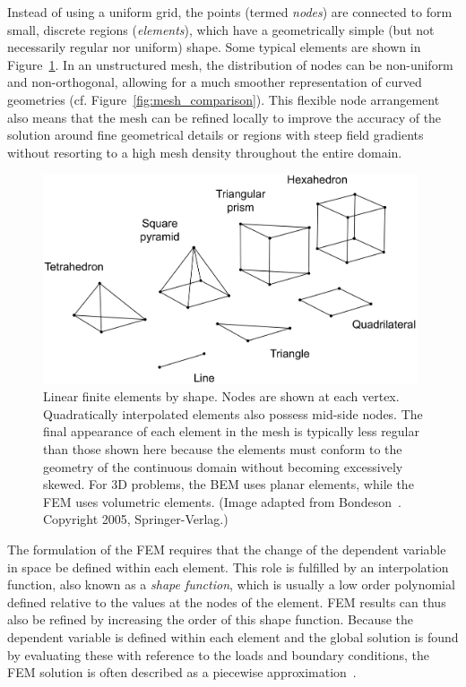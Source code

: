 Instead of using a uniform grid, the points (termed \emph{nodes}) are connected
to form small, discrete regions (\emph{elements}), which have a geometrically
simple (but not necessarily regular nor uniform) shape. Some typical elements
are shown in Figure~\ref{fig:element_types}. In an unstructured mesh, the
distribution of nodes can be non-uniform and non-orthogonal, allowing for a much
smoother representation of curved geometries (cf.
Figure~\ref{fig:mesh_comparison}). This flexible node arrangement also means
that the mesh can be refined locally to improve the accuracy of the solution
around fine geometrical details or regions with steep field gradients without
resorting to a high mesh density throughout the entire domain.

\begin{figure}
	\centering
	\includegraphics[height=6.2cm]{Background/element_types}
	\caption[Linear finite elements by shape]{Linear finite elements by shape.
	Nodes are shown at each vertex. Quadratically interpolated elements also
	possess mid-side nodes. The final appearance of each element in the mesh is
	typically less regular than those shown here because the elements must conform
	to the geometry of the continuous domain without becoming excessively skewed.
	For 3D problems, the BEM uses planar elements, while the FEM uses volumetric
	elements. (Image adapted from Bondeson~\cite{bondeson2005}. Copyright
	\textcopyright{} 2005, Springer-Verlag.)}
	\label{fig:element_types}
\end{figure}

The formulation of the FEM requires that the change of the dependent variable in
space be defined within each element. This role is fulfilled by an interpolation
function, also known as a \emph{shape function}, which is usually a low order
polynomial defined relative to the values at the nodes of the element. FEM
results can thus also be refined by increasing the order of this shape function.
Because the dependent variable is defined within each element and the global
solution is found by evaluating these with reference to the loads and boundary
conditions, the FEM solution is often described as a piecewise
approximation~\cite{schimpf1998}.

